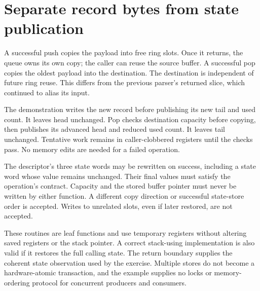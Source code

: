 \section{Separate record bytes from state publication}
A successful push copies the payload into free ring slots. Once it returns, the
queue owns its own copy; the caller can reuse the source buffer. A successful pop
copies the oldest payload into the destination. The destination is independent of
future ring reuse. This differs from the previous parser's returned slice, which
continued to alias its input.

The demonstration writes the new record before publishing its new tail and used
count. It leaves head unchanged. Pop checks destination capacity before copying,
then publishes its advanced head and reduced used count. It leaves tail unchanged.
Tentative work remains in caller-clobbered registers until the checks pass.
No memory edits are needed for a failed operation.

The descriptor's three state words may be rewritten on success, including a state
word whose value remains unchanged. Their final values must satisfy the operation's
contract. Capacity and the stored buffer pointer must never be written by either
function. A different copy direction or successful state-store order is accepted.
Writes to unrelated slots, even if later restored, are not accepted.

These routines are leaf functions and use temporary registers without altering
saved registers or the stack pointer. A correct stack-using implementation is also
valid if it restores the full calling state. The return boundary supplies the
coherent state observation used by the exercise. Multiple stores do not become a
hardware-atomic transaction, and the example supplies no locks or memory-ordering
protocol for concurrent producers and consumers.
